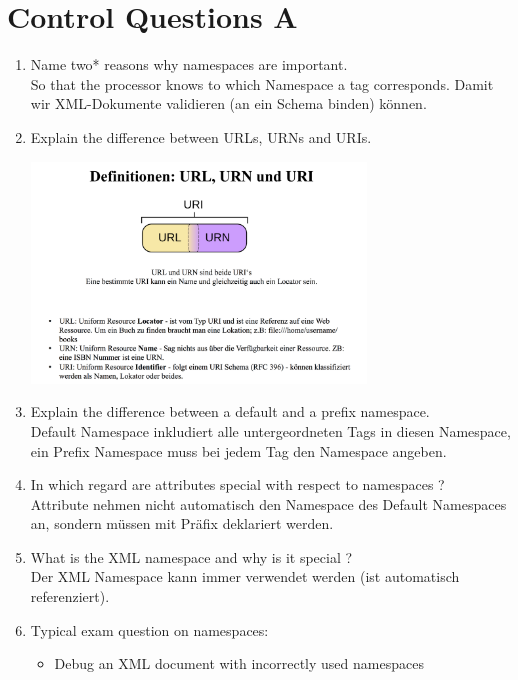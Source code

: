 \section{Control Questions A}
\begin{enumerate}
\item Name two* reasons why namespaces are important.\\
So that the processor knows to which Namespace a tag corresponds. Damit wir XML-Dokumente validieren (an ein Schema binden) können.
\item Explain the difference between URLs, URNs and URIs.\\
\begin{center}
\includegraphics[width=0.7\textwidth]{fig/URI.png}
\end{center}
\item Explain the difference between a default and a prefix namespace.\\
Default Namespace inkludiert alle untergeordneten Tags in diesen Namespace, ein Prefix Namespace muss bei jedem Tag den Namespace angeben.
\item In which regard are attributes special with respect to namespaces ?\\
Attribute nehmen nicht automatisch den Namespace des Default Namespaces an, sondern müssen mit Präfix deklariert werden.
\item What is the XML namespace and why is it special ?\\
Der XML Namespace kann immer verwendet werden (ist automatisch referenziert).
\item Typical exam question on namespaces:
\begin{itemize}
\item Debug an XML document with incorrectly used namespaces
\end{itemize}
\end{enumerate}

